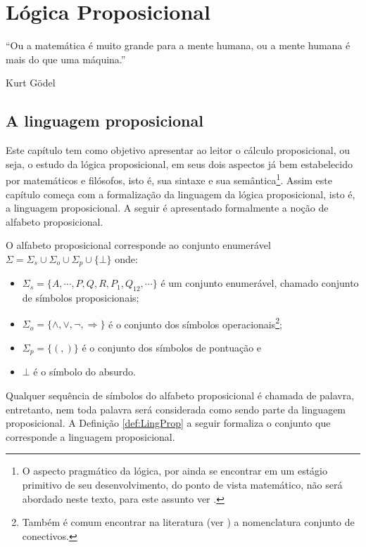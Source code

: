 \chapter{Lógica Proposicional}\label{cap:LogicaProposicional}

\epigraph{``Ou a matemática é muito grande para a mente humana, ou a mente humana é mais do que uma máquina.''}{Kurt Gödel}

\section{A linguagem proposicional}

Este capítulo tem como objetivo apresentar ao leitor o cálculo proposicional, ou seja, o estudo da lógica proposicional, em seus dois aspectos já bem estabelecido por matemáticos e filósofos, isto é,  sua sintaxe e sua semântica\footnote{O aspecto pragmático da lógica, por ainda se encontrar em um estágio primitivo de seu desenvolvimento, do ponto de vista matemático, não será abordado neste texto, para este assunto ver \cite{rodrigues2021, silva2018}.}. Assim este capítulo começa com a formalização da linguagem da lógica proposicional, isto é, a linguagem proposicional. A seguir é apresentado formalmente a noção de alfabeto proposicional.

\begin{definition}\label{def:AlfProp}
    O alfabeto proposicional corresponde ao conjunto enumerável $\Sigma = \Sigma_s \cup \Sigma_o \cup \Sigma_p \cup \{\bot\}$ onde:
    \begin{itemize}
        \item $\Sigma_s = \{A, \cdots, P, Q, R, P_1, Q_{12}, \cdots\}$ é um conjunto enumerável, chamado conjunto de símbolos proposicionais;
        \item $\Sigma_o = \{\land, \lor, \neg, \Rightarrow\}$ é o conjunto dos símbolos operacionais\footnote{Também é comum encontrar na literatura (ver \cite{joaoPavao2014}) a nomenclatura conjunto de conectivos.};
        \item $\Sigma_p = \{(, )\}$ é o conjunto dos símbolos de pontuação e
        \item $\bot$ é o símbolo do absurdo.
    \end{itemize}
\end{definition}

Qualquer sequência de símbolos do alfabeto proposicional é chamada de palavra, entretanto, nem toda palavra será considerada como sendo parte da linguagem proposicional. A Definição \ref{def:LingProp} a seguir formaliza o conjunto que corresponde a linguagem proposicional.

